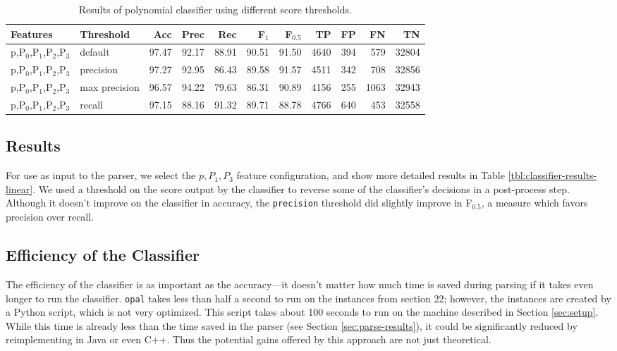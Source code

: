 \documentclass[11pt]{article}
\begin{document}
\begin{table}[htbp]

\begin{tabular}{llrrrrrrrrr}
Features & Threshold & Acc & Prec & Rec & F$_{\text{1}}$ & F$_{\text{0.5}}$ & TP & FP & FN & TN\\
\hline
p,P$_{\text{0}}$,P$_{\text{1}}$,P$_{\text{2}}$,P$_{\text{3}}$ & default & 97.47 & 92.17 & 88.91 & 90.51 & 91.50 & 4640 & 394 & 579 & 32804\\
p,P$_{\text{0}}$,P$_{\text{1}}$,P$_{\text{2}}$,P$_{\text{3}}$ & precision & 97.27 & 92.95 & 86.43 & 89.58 & 91.57 & 4511 & 342 & 708 & 32856\\
p,P$_{\text{0}}$,P$_{\text{1}}$,P$_{\text{2}}$,P$_{\text{3}}$ & max precision & 96.57 & 94.22 & 79.63 & 86.31 & 90.89 & 4156 & 255 & 1063 & 32943\\
p,P$_{\text{0}}$,P$_{\text{1}}$,P$_{\text{2}}$,P$_{\text{3}}$ & recall & 97.15 & 88.16 & 91.32 & 89.71 & 88.78 & 4766 & 640 & 453 & 32558\\
\end{tabular}

\caption{Results of polynomial classifier using different score thresholds.}
\label{tbl:classifier-results-poly}
\end{table}

\subsection{Results}
\label{sec-4-4}

\label{sec:linear-classifier}
For use as input to the parser, we select the $p,P_{1},P_{3}$
feature configuration, and show more detailed results in
Table \ref{tbl:classifier-results-linear}. We used a threshold on the
score output by the classifier to reverse some of the classifier's
decisions in a post-process step. Although it doesn't improve on the
classifier in accuracy, the \texttt{precision} threshold did slightly improve in
F$_{\text{0.5}}$, a measure which favors precision over recall.

\subsection{Efficiency of the Classifier}
\label{sec-4-5}

The efficiency of the classifier is as important as the accuracy---it doesn't
matter how much time is saved during parsing if it takes even longer to run the
classifier. \texttt{opal} takes less than half a second to run on the instances from
section 22; however, the instances are created by a Python script, which is not
very optimized. This script takes about 100 seconds to run on the machine
described in Section \ref{sec:setup}. While this time is already less than the
time saved in the parser (see Section \ref{sec:parse-results}), it could be
significantly reduced by reimplementing in Java or even C++. Thus the potential
gains offered by this approach are not just theoretical.
\end{document}
